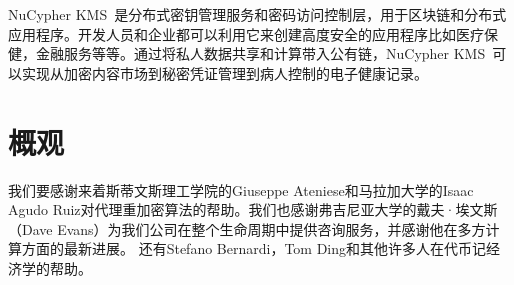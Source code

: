 \documentclass[longbibliography,nofootinbib]{revtex4-1}
\newcommand{\kms}{NuCypher KMS}
\begin{document}
\begin{CJK*}{UTF8}{gbsn}
    \kms~是分布式密钥管理服务和密码访问控制层，用于区块链和分布式应用程序。开发人员和企业都可以利用它来创建高度安全的应用程序比如医疗保健，金融服务等等。通过将私人数据共享和计算带入公有链，\kms~可以实现从加密内容市场到秘密凭证管理到病人控制的电子健康记录。


\section{概观}

	我们要感谢来着斯蒂文斯理工学院的Giuseppe Ateniese和马拉加大学的Isaac Agudo Ruiz对代理重加密算法的帮助。我们也感谢弗吉尼亚大学的戴夫·埃文斯（Dave Evans）为我们公司在整个生命周期中提供咨询服务，并感谢他在多方计算方面的最新进展。 还有Stefano Bernardi，Tom Ding和其他许多人在代币记经济学的帮助。
    
\end{CJK*}


\end{document}
